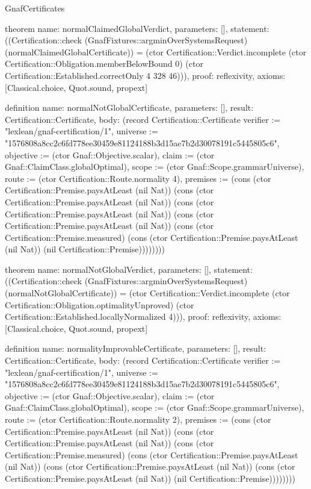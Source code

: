 \begin{lexlean}{GnafCertificates}
\begin{semanticmodule}
theorem{
  name: normalClaimedGlobalVerdict,
  parameters: [],
  statement: ((Certification::check (GnafFixtures::argminOverSystemsRequest) (normalClaimedGlobalCertificate)) = (ctor Certification::Verdict.incomplete (ctor Certification::Obligation.memberBelowBound 0) (ctor Certification::Established.correctOnly 4 328 46))),
  proof: reflexivity{},
  axioms: [Classical.choice, Quot.sound, propext]
}

definition{
  name: normalNotGlobalCertificate,
  parameters: [],
  result: Certification::Certificate,
  body: (record Certification::Certificate {verifier := "lexlean/gnaf-certification/1", universe := "1576808a8cc2c6fd778ee30459e81124188b3d15ae7b2d30078191c5445805c6", objective := (ctor Gnaf::Objective.scalar), claim := (ctor Gnaf::ClaimClass.globalOptimal), scope := (ctor Gnaf::Scope.grammarUniverse), route := (ctor Certification::Route.normality 4), premises := (cons (ctor Certification::Premise.paysAtLeast (nil Nat)) (cons (ctor Certification::Premise.paysAtLeast (nil Nat)) (cons (ctor Certification::Premise.paysAtLeast (nil Nat)) (cons (ctor Certification::Premise.paysAtLeast (nil Nat)) (cons (ctor Certification::Premise.measured) (cons (ctor Certification::Premise.paysAtLeast (nil Nat)) (nil Certification::Premise)))))))})
}

theorem{
  name: normalNotGlobalVerdict,
  parameters: [],
  statement: ((Certification::check (GnafFixtures::argminOverSystemsRequest) (normalNotGlobalCertificate)) = (ctor Certification::Verdict.incomplete (ctor Certification::Obligation.optimalityUnproved) (ctor Certification::Established.locallyNormalized 4))),
  proof: reflexivity{},
  axioms: [Classical.choice, Quot.sound, propext]
}

definition{
  name: normalityImprovableCertificate,
  parameters: [],
  result: Certification::Certificate,
  body: (record Certification::Certificate {verifier := "lexlean/gnaf-certification/1", universe := "1576808a8cc2c6fd778ee30459e81124188b3d15ae7b2d30078191c5445805c6", objective := (ctor Gnaf::Objective.scalar), claim := (ctor Gnaf::ClaimClass.globalOptimal), scope := (ctor Gnaf::Scope.grammarUniverse), route := (ctor Certification::Route.normality 2), premises := (cons (ctor Certification::Premise.paysAtLeast (nil Nat)) (cons (ctor Certification::Premise.paysAtLeast (nil Nat)) (cons (ctor Certification::Premise.measured) (cons (ctor Certification::Premise.paysAtLeast (nil Nat)) (cons (ctor Certification::Premise.paysAtLeast (nil Nat)) (cons (ctor Certification::Premise.paysAtLeast (nil Nat)) (nil Certification::Premise)))))))})
}


\end{semanticmodule}
\end{lexlean}
